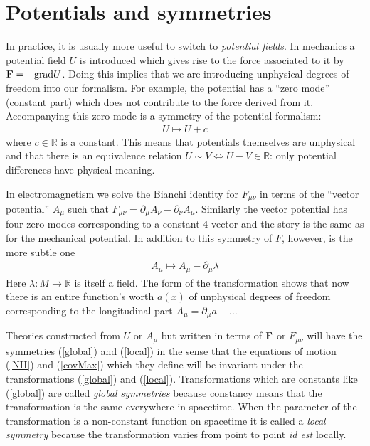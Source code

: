 \documentclass[12pt]{article}
\begin{document}
\section{Potentials and symmetries}

In practice, it is usually more useful to switch to {\em potential fields}. In mechanics a potential field $U$ is introduced which gives rise to the force associated to it by ${\bf F}=-{\rm grad} U$. Doing this implies that we are introducing unphysical degrees of freedom into our formalism. For example, the potential has a ``zero mode'' (constant part) which does not contribute to the force derived from it. Accompanying this zero mode is a symmetry of the potential formalism:
\begin{eqnarray}
\label{global}
U\mapsto U+c
\end{eqnarray}
where $c\in {\mathbb R}$ is a constant. This means that potentials themselves are unphysical and that there is an equivalence relation $U\sim V\Leftrightarrow U-V\in {\mathbb R}$: only potential differences have physical meaning.

In electromagnetism we solve the Bianchi identity for $F_{\mu \nu}$ in terms of the ``vector potential'' $A_\mu$ such that $F_{\mu \nu}=\partial_\mu A_\nu -\partial_\nu A_\mu$. Similarly the vector potential has four zero modes corresponding to a constant 4-vector and the story is the same as for the mechanical potential. In addition to this symmetry of $F$, however, is the more subtle one
\begin{eqnarray}
\label{local}
A_\mu \mapsto A_\mu-\partial_\mu \lambda
\end{eqnarray}
Here $\lambda: M\to {\mathbb R}$ is itself a field. The form of the transformation shows that now there is an entire function's worth $a(x)$ of unphysical degrees of freedom corresponding to the longitudinal part $A_\mu=\partial_\mu a+\dots$

Theories constructed from $U$ or $A_\mu$ but written in terms of ${\bf F}$ or $F_{\mu \nu}$ will have the symmetries (\ref{global}) and (\ref{local}) in the sense that the equations of motion (\ref{NII}) and (\ref{covMax}) which they define will be invariant under the transformations (\ref{global}) and (\ref{local}). Transformations which are constants like (\ref{global}) are called {\em global symmetries} because constancy means that the transformation is the same everywhere in spacetime. When the parameter of the transformation is a non-constant function on spacetime it is called a {\em local symmetry} because the transformation %
varies from point to point {\it id est} locally.
\end{document}
